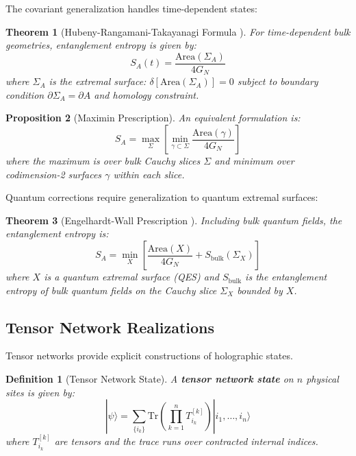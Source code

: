 \documentclass[11pt,a4paper]{article}
\newtheorem{theorem}{Theorem}[section]
\newtheorem{proposition}[theorem]{Proposition}
\newtheorem{definition}{Definition}[section]
\theoremstyle{remark}
\theoremstyle{definition}
\begin{document}
The covariant generalization handles time-dependent states:

\begin{theorem}[Hubeny-Rangamani-Takayanagi Formula \cite{Hubeny2007}]
For time-dependent bulk geometries, entanglement entropy is given by:
\begin{equation}
S_A(t) = \frac{\text{Area}(\Sigma_A)}{4 G_N}
\end{equation}
where $\Sigma_A$ is the extremal surface: $\delta[\text{Area}(\Sigma_A)] = 0$ subject to boundary condition $\partial \Sigma_A = \partial A$ and homology constraint.
\end{theorem}

\begin{proposition}[Maximin Prescription]
An equivalent formulation is:
\begin{equation}
S_A = \max_{\Sigma} \left[\min_{\gamma \subset \Sigma} \frac{\text{Area}(\gamma)}{4G_N}\right]
\end{equation}
where the maximum is over bulk Cauchy slices $\Sigma$ and minimum over codimension-2 surfaces $\gamma$ within each slice.
\end{proposition}

Quantum corrections require generalization to quantum extremal surfaces:

\begin{theorem}[Engelhardt-Wall Prescription \cite{Engelhardt2014}]
Including bulk quantum fields, the entanglement entropy is:
\begin{equation}
S_A = \min_{X} \left[\frac{\text{Area}(X)}{4G_N} + S_{\text{bulk}}(\Sigma_X)\right]
\end{equation}
where $X$ is a quantum extremal surface (QES) and $S_{\text{bulk}}$ is the entanglement entropy of bulk quantum fields on the Cauchy slice $\Sigma_X$ bounded by $X$.
\end{theorem}

\subsection{Tensor Network Realizations}

Tensor networks provide explicit constructions of holographic states.

\begin{definition}[Tensor Network State]
A \textbf{tensor network state} on $n$ physical sites is given by:
\begin{equation}
|\psi\rangle = \sum_{\{i_k\}} \text{Tr}\left(\prod_{k=1}^n T^{[k]}_{i_k}\right) |i_1, \ldots, i_n\rangle
\end{equation}
where $T^{[k]}_{i_k}$ are tensors and the trace runs over contracted internal indices.
\end{definition}
\end{document}
